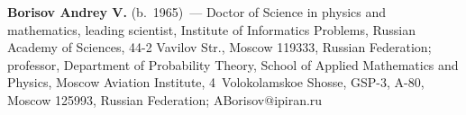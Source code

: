 \vspace*{-18pt}

\Contrl

  \noindent
  \textbf{Borisov Andrey V.} (b.\ 1965)~--- Doctor of Science in
physics and mathematics, leading scientist,
Institute of Informatics Problems, Russian
Academy of Sciences, 44-2 Vavilov Str., Moscow 119333, Russian Federation;
professor, Department of Probability Theory, School of Applied Mathematics and
Physics, Moscow Aviation Institute, 4~Volokolamskoe Shosse, GSP-3, A-80, Moscow
125993, Russian Federation; ABorisov@ipiran.ru


\label{end\stat}

\renewcommand{\bibname}{\protect\rm Литература}